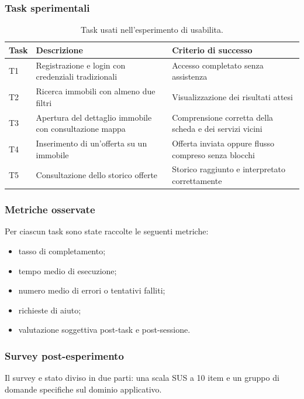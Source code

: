 \documentclass[a4paper,11pt]{article}
\begin{document}
\subsubsection{Task sperimentali}
\begin{table}[H]
\centering
\begin{tabularx}{\textwidth}{@{}p{}p{}p{}@{}}
\toprule
Task & Descrizione & Criterio di successo \\
\midrule
T1 & Registrazione e login con credenziali tradizionali & Accesso completato senza assistenza \\
T2 & Ricerca immobili con almeno due filtri & Visualizzazione dei risultati attesi \\
T3 & Apertura del dettaglio immobile con consultazione mappa & Comprensione corretta della scheda e dei servizi vicini \\
T4 & Inserimento di un'offerta su un immobile & Offerta inviata oppure flusso compreso senza blocchi \\
T5 & Consultazione dello storico offerte & Storico raggiunto e interpretato correttamente \\
\bottomrule
\end{tabularx}
\caption{Task usati nell'esperimento di usabilita.}
\label{tab:task}
\end{table}

\subsubsection{Metriche osservate}
Per ciascun task sono state raccolte le seguenti metriche:
\begin{itemize}
  \item tasso di completamento;
  \item tempo medio di esecuzione;
  \item numero medio di errori o tentativi falliti;
  \item richieste di aiuto;
  \item valutazione soggettiva post-task e post-sessione.
\end{itemize}

\subsubsection{Survey post-esperimento}
Il survey e stato diviso in due parti: una scala SUS a 10 item e un gruppo di domande specifiche sul dominio applicativo.
\end{document}
